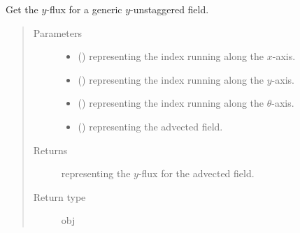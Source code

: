 \documentclass[letterpaper,10pt,english]{sphinxmanual}
\begin{document}
\begin{fulllineitems}
\begin{fulllineitems}
\end{fulllineitems}


\begin{fulllineitems}
\label{\detokenize{api:dycore.flux_isentropic_nonconservative_centered.FluxIsentropicNonconservativeCentered._get_centered_flux_y_unstg}}
Get the \(y\)-flux for a generic \(y\)-unstaggered field.
\begin{quote}\begin{description}
\item[{Parameters}] \leavevmode\begin{itemize}
\item {} 
 () \textendash{}  representing the index running along the \(x\)-axis.

\item {} 
 () \textendash{}  representing the index running along the \(y\)-axis.

\item {} 
 () \textendash{}  representing the index running along the \(\theta\)-axis.

\item {} 
 () \textendash{}  representing the advected field.

\end{itemize}

\item[{Returns}] \leavevmode
{} representing the \(y\)-flux for the advected field.

\item[{Return type}] \leavevmode
obj

\end{description}\end{quote}

\end{fulllineitems}



\end{fulllineitems}
\end{document}
